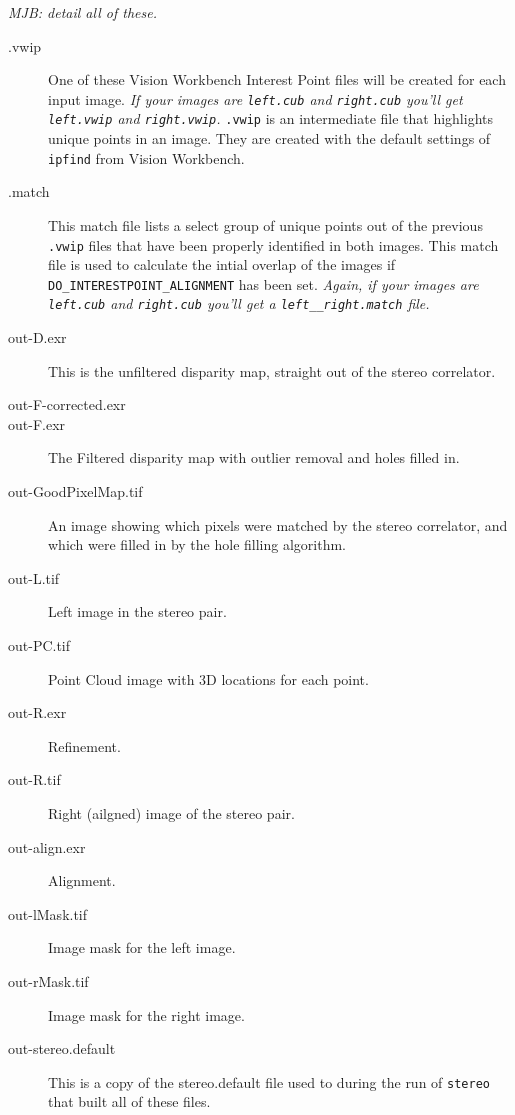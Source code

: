 \emph{MJB: detail all of these.}

\begin{description}

\item[.vwip] One of these Vision Workbench Interest Point files will
  be created for each input image. \emph{If your images are
  \texttt{left.cub} and \texttt{right.cub} you'll get
  \texttt{left.vwip} and \texttt{right.vwip}.} \texttt{.vwip} is an
  intermediate file that highlights unique points in an image. They
  are created with the default settings of \texttt{ipfind} from Vision
  Workbench.

\item[.match] This match file lists a select group of unique points
  out of the previous \texttt{.vwip} files that have been properly
  identified in both images. This match file is used to calculate the
  intial overlap of the images if
  \texttt{DO\_INTERESTPOINT\_ALIGNMENT} has been set.  \emph{Again, if
    your images are \texttt{left.cub} and \texttt{right.cub} you'll
    get a \texttt{left\_\_right.match} file.}

\item[out-D.exr] 
This is the unfiltered disparity map, straight out of the stereo correlator.

\item[out-F-corrected.exr]

\item[out-F.exr]
The Filtered disparity map with outlier removal and holes filled in.

\item[out-GoodPixelMap.tif]
An image showing which pixels were matched by the stereo correlator,
and which were filled in by the hole filling algorithm.

\item[out-L.tif]
Left image in the stereo pair.

\item[out-PC.tif]
Point Cloud image with 3D locations for each point.

\item[out-R.exr] Refinement.

\item[out-R.tif]
Right (ailgned) image of the stereo pair.

\item[out-align.exr] Alignment.
\item[out-lMask.tif] Image mask for the left image.
\item[out-rMask.tif] Image mask for the right image.

\item[out-stereo.default] This is a copy of the stereo.default file
  used to during the run of \texttt{stereo} that built all of these
  files.


\end{description}

